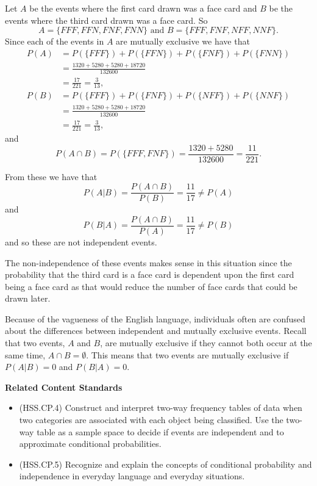 \documentclass[
]{book}
\providecommand{\tightlist}{%
  \setlength{\itemsep}{0pt}\setlength{\parskip}{0pt}}
\newenvironment{standards}{}{}
\theoremstyle{definition}
\theoremstyle{definition}
\theoremstyle{definition}
\theoremstyle{definition}
\theoremstyle{remark}
\begin{document}
Let \(A\) be the events where the first card drawn was a face card and \(B\) be the events where the third card drawn was a face card. So
\[A = \{FFF, FFN, FNF, FNN\} \mbox{ and } B=\{FFF, FNF, NFF, NNF\}.\]
Since each of the events in \(A\) are mutually exclusive we have that
\begin{align}
P(A) &= P(\{FFF\}) + P(\{FFN\}) + P(\{FNF\}) + P(\{FNN\}) \\ &= \frac{1320 + 5280 + 5280 + 18720}{132600} \\ &= \frac{17}{221} = \frac{3}{13},
\end{align}
\begin{align}
P(B) &= P(\{FFF\}) + P(\{FNF\}) + P(\{NFF\}) + P(\{NNF\}) \\ &= \frac{1320+5280+5280+18720}{132600} \\ &= \frac{17}{221} = \frac{3}{13},
\end{align}
and \[P(A\cap B) = P(\{FFF,FNF\}) = \frac{1320+5280}{132600}= \frac{11}{221}.\]

From these we have that
\[ P(A\vert B) = \frac{P(A\cap B)}{P(B)} = \frac{11}{17} \neq P(A)\]
and
\[P(B\vert A) = \frac{P(A\cap B)}{P(A)} = \frac{11}{17} \neq P(B)\] and so these are not independent events.

The non-independence of these events makes sense in this situation since the probability that the third card is a face card is dependent upon the first card being a face card as that would reduce the number of face cards that could be drawn later.

Because of the vagueness of the English language, individuals often are confused about the differences between independent and mutually exclusive events. Recall that two events, \(A\) and \(B\), are mutually exclusive if they cannot both occur at the same time, \(A\cap B=\emptyset\). This means that two events are mutually exclusive if \(P(A|B)=0\) and \(P(B|A)=0\).

\begin{standards}

\begin{center}
\textbf{Related Content Standards}

\end{center}

\begin{itemize}
\tightlist
\item
  (HSS.CP.4) Construct and interpret two-way frequency tables of data when two categories are associated with each object being classified. Use the two-way table as a sample space to decide if events are independent and to approximate conditional probabilities.
\item
  (HSS.CP.5) Recognize and explain the concepts of conditional probability and independence in everyday language and everyday situations.
\end{itemize}

\end{standards}
\end{document}
